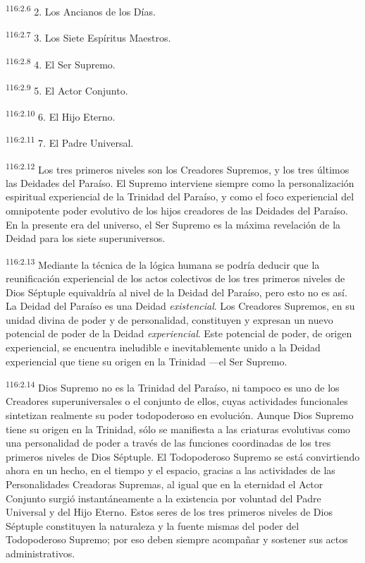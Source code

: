 \documentclass[twoside, 11pt]{book}
\begin{document}
\par
\textsuperscript{116:2.6} 2. Los Ancianos de los Días.

\par
\textsuperscript{116:2.7} 3. Los Siete Espíritus Maestros.

\par
\textsuperscript{116:2.8} 4. El Ser Supremo.

\par
\textsuperscript{116:2.9} 5. El Actor Conjunto.

\par
\textsuperscript{116:2.10} 6. El Hijo Eterno.

\par
\textsuperscript{116:2.11} 7. El Padre Universal.

\par
\textsuperscript{116:2.12} Los tres primeros niveles son los Creadores Supremos, y los tres últimos las Deidades del Paraíso. El Supremo interviene siempre como la personalización espiritual experiencial de la Trinidad del Paraíso, y como el foco experiencial del omnipotente poder evolutivo de los hijos creadores de las Deidades del Paraíso. En la presente era del universo, el Ser Supremo es la máxima revelación de la Deidad para los siete superuniversos.

\par
\textsuperscript{116:2.13} Mediante la técnica de la lógica humana se podría deducir que la reunificación experiencial de los actos colectivos de los tres primeros niveles de Dios Séptuple equivaldría al nivel de la Deidad del Paraíso, pero esto no es así. La Deidad del Paraíso es una Deidad \textit{existencial}. Los Creadores Supremos, en su unidad divina de poder y de personalidad, constituyen y expresan un nuevo potencial de poder de la Deidad \textit{experiencial}. Este potencial de poder, de origen experiencial, se encuentra ineludible e inevitablemente unido a la Deidad experiencial que tiene su origen en la Trinidad ---el Ser Supremo.

\par
\textsuperscript{116:2.14} Dios Supremo no es la Trinidad del Paraíso, ni tampoco es uno de los Creadores superuniversales o el conjunto de ellos, cuyas actividades funcionales sintetizan realmente su poder todopoderoso en evolución. Aunque Dios Supremo tiene su origen en la Trinidad, sólo se manifiesta a las criaturas evolutivas como una personalidad de poder a través de las funciones coordinadas de los tres primeros niveles de Dios Séptuple. El Todopoderoso Supremo se está convirtiendo ahora en un hecho, en el tiempo y el espacio, gracias a las actividades de las Personalidades Creadoras Supremas, al igual que en la eternidad el Actor Conjunto surgió instantáneamente a la existencia por voluntad del Padre Universal y del Hijo Eterno. Estos seres de los tres primeros niveles de Dios Séptuple constituyen la naturaleza y la fuente mismas del poder del Todopoderoso Supremo; por eso deben siempre acompañar y sostener sus actos administrativos.
\end{document}
